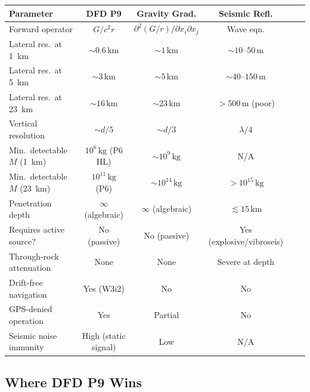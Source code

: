 \documentclass[aps,prd,twocolumn,superscriptaddress,nofootinbib]{revtex4-2}
\newcommand{\km}{\,\mathrm{km}}
\begin{document}
\begin{center}
\begin{tabular}{p{2.8cm}ccccc}
\toprule
Parameter & \textbf{DFD P9} & \textbf{Gravity Grad.} & \textbf{Seismic Refl.} \\
\midrule
Forward operator & $G/c^2r$ & $\partial^2(G/r)/\partial x_i\partial x_j$ & Wave eqn. \\
Lateral res.\ at 1~km & $\sim 0.6\km$ & $\sim 1\km$ & $\sim 10$--$50\,\mathrm{m}$ \\
Lateral res.\ at 5~km & $\sim 3\km$ & $\sim 5\km$ & $\sim 40$--$150\,\mathrm{m}$ \\
Lateral res.\ at 23~km & $\sim 16\km$ & $\sim 23\km$ & $>500\,\mathrm{m}$ (poor) \\
Vertical resolution & $\sim d/5$ & $\sim d/3$ & $\lambda/4$ \\
Min.\ detectable $M$ (1~km) & $10^6\,\mathrm{kg}$ (P6 HL) & $\sim10^9\,\mathrm{kg}$ & N/A \\
Min.\ detectable $M$ (23~km) & $10^{11}\,\mathrm{kg}$ (P6) & $\sim10^{14}\,\mathrm{kg}$ & $>10^{15}\,\mathrm{kg}$ \\
Penetration depth & $\infty$ (algebraic) & $\infty$ (algebraic) & $\lesssim 15\km$ \\
Requires active source? & No (passive) & No (passive) & Yes (explosive/vibroseis) \\
Through-rock attenuation & None & None & Severe at depth \\
Drift-free navigation & Yes (W3i2) & No & No \\
GPS-denied operation & Yes & Partial & No \\
Seismic noise immunity & High (static signal) & Low & N/A \\
\bottomrule
\end{tabular}
\end{center}

\subsection{Where DFD P9 Wins}
\end{document}
